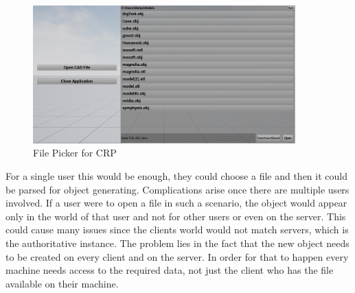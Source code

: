 \begin{figure}[htpb]
	\centering
	\includegraphics[width=0.9\textwidth]{fig/FilePicker2.png}
	\caption[CAD Runtime Presenter File Picker]{File Picker for CRP\protect}
	\label{fig:FilePicker}
\end{figure}

For a single user this would be enough, they could choose a file and then it could be parsed for object generating. Complications arise once there are multiple users involved. If a user were to open a file in such a scenario, the object would appear only in the world of that user and not for other users or even on the server. This could cause many issues since the clients world would not match servers, which is the authoritative instance. The problem lies in the fact that the new object needs to be created on every client and on the server. In order for that to happen every machine needs access to the required data, not just the client who has the file available on their machine.\\

